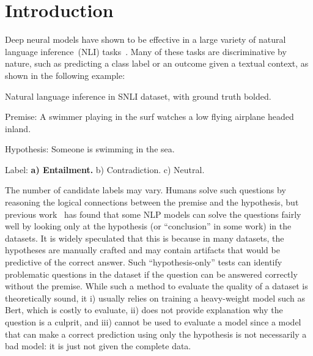 \section{Introduction}
\label{sec:intro}
Deep neural models have shown to be effective in 
a large variety of natural language inference~(NLI)
tasks~\cite{bowman2015large,wang2018glue,mostafazadeh2016corpus,roemmele2011choice,zellers2018swag}. Many of these tasks
are discriminative by nature, such as predicting a class label or
an outcome given a textual context, as shown in the following example:

\begin{example}\label{exp:snli}
Natural language inference in SNLI dataset, with ground truth bolded.
\begin{description}
\item{Premise:} A swimmer playing in the surf watches a low flying airplane headed inland. 
\item{Hypothesis:} Someone is swimming in the sea.
\item{Label:} \textbf{a) Entailment.} b) Contradiction.  c) Neutral.
\end{description}
\end{example}

The number of candidate labels may vary. Humans solve such questions by
reasoning the logical connections between the premise and the hypothesis,
but previous work~\cite{naik2018stress,schuster2019towards} 
has found that some NLP models can solve the questions
fairly well by looking only at the hypothesis (or ``conclusion'' in some work)
in the datasets.
It is widely speculated that this is because in many datasets, 
the hypotheses are manually crafted and may contain artifacts that
would be predictive of the correct answer. 
Such ``hypothesis-only'' tests can identify problematic questions
in the dataset if the question can be answered correctly without 
the premise. While such a method to evaluate the quality of
a dataset is theoretically sound, 
it i) usually relies on training a heavy-weight model such as Bert, which
is costly to evaluate, ii) does not provide explanation why the question is 
a culprit, and iii) cannot be used to evaluate a model since a model that
can make a correct prediction using only the hypothesis is not necessarily a
bad model: it is just not given the complete data.  



